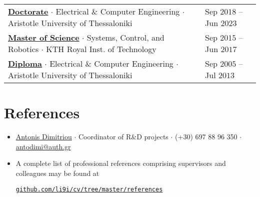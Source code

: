 \documentclass[a4paper,10pt,twoside]{article}
\begin{document}
\begin{center}
\begin{tabular}{ll}
  \href{https://ikee.lib.auth.gr/record/354644}{\textbf{Doctorate}} $\cdot$ Electrical \& Computer Engineering $\cdot$ Aristotle University of Thessaloniki & {\small \textcolor{agray}{Sep $2018$ -- Jun $2023$}} \\
  \href{http://kth.diva-portal.org/smash/record.jsf?pid=diva2\%3A1102597\&dswid=2875}{\textbf{Master of Science}} $\cdot$ Systems, Control, and Robotics $\cdot$ KTH Royal Inst. of Technology & {\small \textcolor{agray}{Sep $2015$ -- Jun $2017$}} \\
  \href{https://ikee.lib.auth.gr/record/291560}{\textbf{Diploma}} $\cdot$ Electrical \& Computer Engineering $\cdot$ Aristotle University of Thessaloniki & {\small \textcolor{agray}{Sep $2005$ -- Jul $2013$}}
\end{tabular}
\end{center}
\verticalspacebetweensections


\section{\textbf{References}}\verticalspacebetweensectionandcontent
\begin{itemize}
  \item \href{https://gr.linkedin.com/in/antonis-dimitriou-21003452}{Antonis Dimitriou} $\cdot$ Coordinator of R\&D projects $\cdot$ (+30) 697 88 96 350 $\cdot$ \href{mailto:antodimi@auth.gr}{antodimi@auth.gr} \verticalspaceafteritem

\item A complete list of professional references comprising supervisors and colleagues may be found at\verticalspaceafteritem\vspace{0.5em}
\begin{center}\noindent
\href{https://mozilla.github.io/pdf.js/web/viewer.html?file=https://raw.githubusercontent.com/li9i/cv/master/references/references_alexandros_filotheou.pdf}{\texttt{github.com/li9i/cv/tree/master/references}}
\end{center}
\end{itemize}
\end{document}
